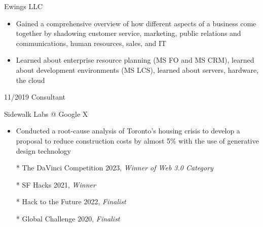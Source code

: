 \documentclass[9pt]{developercv} %
\begin{document}
\begin{entrylist}
{        Ewings LLC
        \vspace{5pt}
        \begin{itemize}[noitemsep,topsep=0pt,parsep=0pt,partopsep=0pt, leftmargin=-1pt]
            \item Gained a comprehensive overview of how different aspects of a business come together by shadowing customer service, marketing, public relations and communications, human resources, sales, and IT
            \item Learned about enterprise resource planning (MS FO and MS CRM), learned about development environments (MS LCS), learned about servers, hardware, the cloud
        \end{itemize} 
        }

        \entry
		{11/2019}
		{Consultant}
		{}
		{\vspace{-10pt}
  
        Sidewalk Labs @ Google X
        \vspace{5pt}
        \begin{itemize}[noitemsep,topsep=0pt,parsep=0pt,partopsep=0pt, leftmargin=-1pt]
            \item Conducted a root-cause analysis of Toronto’s housing crisis to develop a proposal to reduce construction costs by almost 5\% with the use of generative design technology
        \end{itemize} 
        }
\end{entrylist}

\begin{enumerate}
    \item[*] The DaVinci Competition 2023, \textit{Winner of Web 3.0 Category}
    \item[*] SF Hacks 2021, \textit{Winner}
    \item[*] Hack to the Future 2022, \textit{Finalist}
    \item[*] Global Challenge 2020, \textit{Finalist}
\end{enumerate}

\vspace{10pt}
\end{document}
